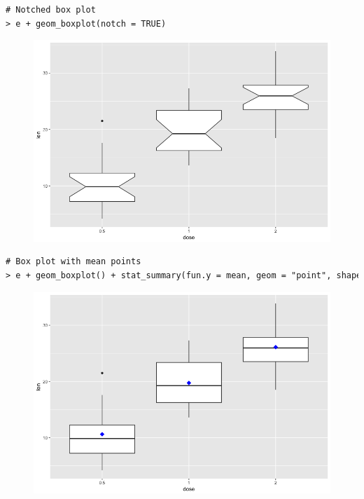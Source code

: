 \begin{lstlisting}[language=html]
# Notched box plot
> e + geom_boxplot(notch = TRUE)
\end{lstlisting}
\begin{figure}[H]\begin{center}\includegraphics[scale=1 ]{ilu/bg72.png}\end{center}\end{figure}
\begin{lstlisting}[language=html]
# Box plot with mean points
> e + geom_boxplot() + stat_summary(fun.y = mean, geom = "point", shape = 18, size = 4, color = "blue")
\end{lstlisting}
\begin{figure}[H]\begin{center}\includegraphics[scale=1 ]{ilu/bg73.png}\end{center}\end{figure}
